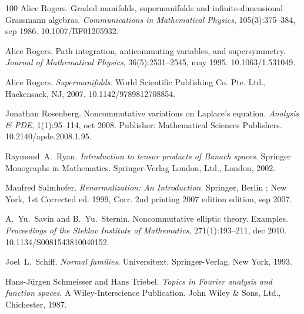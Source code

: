 \documentclass{article}
\newcommand{\tmtextit}[1]{{\itshape{#1}}}
\begin{document}
\begin{thebibliography}{100}
  Alice Rogers. {\newblock}Graded manifolds,
  supermanifolds and infinite-dimensional Grassmann algebras.
  {\newblock}\tmtextit{Communications in Mathematical Physics},
  105(3):375--384, sep 1986.
  {\newblock}\href{Https://doi.org/10.1007/BF01205932}{}10.1007/BF01205932.{\newblock}
  
  Alice Rogers. {\newblock}Path integration,
  anticommuting variables, and supersymmetry. {\newblock}\tmtextit{Journal of
  Mathematical Physics}, 36(5):2531--2545, may 1995.
  {\newblock}\href{Https://doi.org/10.1063/1.531049}{}10.1063/1.531049.{\newblock}
  
  Alice Rogers. {\newblock}\tmtextit{Supermanifolds}.
  {\newblock}World Scientific Publishing Co. Pte. Ltd., Hackensack, NJ, 2007.
  {\newblock}\href{Https://doi.org/10.1142/9789812708854}{}10.1142/9789812708854.{\newblock}
  
  Jonathan Rosenberg.
  {\newblock}Noncommutative variations on Laplace's equation.
  {\newblock}\tmtextit{Analysis \& PDE}, 1(1):95--114, oct 2008.
  {\newblock}Publisher: Mathematical Sciences Publishers.
  \href{https://doi.org/10.2140/apde.2008.1.95}{}10.2140/apde.2008.1.95.{\newblock}
  
  Raymond~A.~Ryan. {\newblock}\tmtextit{Introduction to
  tensor products of Banach spaces}. {\newblock}Springer Monographs in
  Mathematics. Springer-Verlag London, Ltd., London, 2002.{\newblock}
  
  Manfred Salmhofer.
  {\newblock}\tmtextit{Renormalization: An Introduction}. {\newblock}Springer,
  Berlin ; New York, 1st Corrected ed. 1999, Corr. 2nd printing 2007 edition 
  edition, sep 2007.{\newblock}
  
  A.~Yu.~Savin  and  B.~Yu.~Sternin.
  {\newblock}Noncommutative elliptic theory. Examples.
  {\newblock}\tmtextit{Proceedings of the Steklov Institute of Mathematics},
  271(1):193--211, dec 2010.
  {\newblock}\href{Https://doi.org/10.1134/S0081543810040152}{}10.1134/S0081543810040152.{\newblock}
  
  Joel~L.~Schiff. {\newblock}\tmtextit{Normal
  families}. {\newblock}Universitext. Springer-Verlag, New York,
  1993.{\newblock}
  
  Hans-J{\"u}rgen Schmeisser  and  Hans
  Triebel. {\newblock}\tmtextit{Topics in Fourier analysis and function
  spaces}. {\newblock}A Wiley-Interscience Publication. John Wiley \& Sons,
  Ltd., Chichester, 1987.{\newblock}
  

\end{thebibliography}
\end{document}
